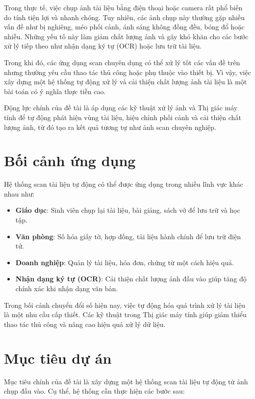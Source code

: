 \documentclass[12pt, a4paper]{report}
\begin{document}
Trong thực tế, việc chụp ảnh tài liệu bằng điện thoại hoặc camera rất phổ biến do tính tiện lợi và nhanh chóng. Tuy nhiên, các ảnh chụp này thường gặp nhiều vấn đề như bị nghiêng, méo phối cảnh, ánh sáng không đồng đều, bóng đổ hoặc nhiễu. Những yếu tố này làm giảm chất lượng ảnh và gây khó khăn cho các bước xử lý tiếp theo như nhận dạng ký tự (OCR) hoặc lưu trữ tài liệu.

Trong khi đó, các ứng dụng scan chuyên dụng có thể xử lý tốt các vấn đề trên nhưng thường yêu cầu thao tác thủ công hoặc phụ thuộc vào thiết bị. Vì vậy, việc xây dựng một hệ thống tự động xử lý và cải thiện chất lượng ảnh tài liệu là một bài toán có ý nghĩa thực tiễn cao.

Động lực chính của đề tài là áp dụng các kỹ thuật xử lý ảnh và Thị giác máy tính để tự động phát hiện vùng tài liệu, hiệu chỉnh phối cảnh và cải thiện chất lượng ảnh, từ đó tạo ra kết quả tương tự như ảnh scan chuyên nghiệp.

\section{Bối cảnh ứng dụng}

Hệ thống scan tài liệu tự động có thể được ứng dụng trong nhiều lĩnh vực khác nhau như:

\begin{itemize}
    \item \textbf{Giáo dục}: Sinh viên chụp lại tài liệu, bài giảng, sách vở để lưu trữ và học tập.
    \item \textbf{Văn phòng}: Số hóa giấy tờ, hợp đồng, tài liệu hành chính để lưu trữ điện tử.
    \item \textbf{Doanh nghiệp}: Quản lý tài liệu, hóa đơn, chứng từ một cách hiệu quả.
    \item \textbf{Nhận dạng ký tự (OCR)}: Cải thiện chất lượng ảnh đầu vào giúp tăng độ chính xác khi nhận dạng văn bản.
\end{itemize}

Trong bối cảnh chuyển đổi số hiện nay, việc tự động hóa quá trình xử lý tài liệu là một nhu cầu cấp thiết. Các kỹ thuật trong Thị giác máy tính giúp giảm thiểu thao tác thủ công và nâng cao hiệu quả xử lý dữ liệu.

\section{Mục tiêu dự án}

Mục tiêu chính của đề tài là xây dựng một hệ thống scan tài liệu tự động từ ảnh chụp đầu vào. Cụ thể, hệ thống cần thực hiện các bước sau:
\end{document}

